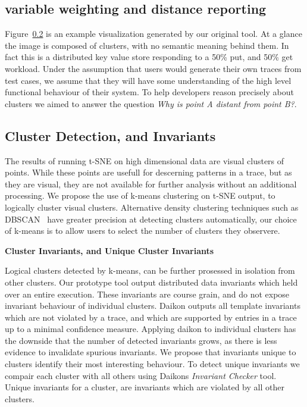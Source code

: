 \subsection{variable weighting and distance reporting}

Figure~\ref{} is an example
visualization generated by our original tool. At a glance the image is
composed of  clusters, with no semantic meaning behind them.
In fact this is a distributed key value store responding to a 50\%
put, and 50\% get workload. Under the assumption that users would
generate their own traces from test cases, we assume that they will
have some understanding of the high level functional behaviour of
their system. To help developers reason precisely about clusters we
aimed to answer the question \emph{Why is point A distant from point
B?}. 

\subsection{Cluster Detection, and Invariants}

The results of running t-SNE on high dimensional data are visual
clusters of points. While these points are usefull for descerning
patterns in a trace, but as they are visual, they are not available
for further analysis without an additional processing. We propose the
use of k-means clustering on t-SNE output, to logically cluster visual
clusters. Alternative density clustering techniques such as
DBSCAN~\cite{} have greater precision at detecting
clusters automatically, our choice of k-means is to allow users to
select the number of clusters they observere.

\textbf{Cluster Invariants, and Unique Cluster Invariants}

Logical clusters detected by k-means, can be further prosessed in
isolation from other clusters. Our prototype tool output distributed
data invariants which held over an entire execution. These invariants
are course grain, and do not expose invariant behaviour of individual
clusters.  
%
Daikon outputs all template invariants which are not violated by a
trace, and which are supported by entries in a trace up to a minimal
confidence measure. Applying daikon to individual clusters has the
downside that the number of detected invariants grows, as there is
less evidence to invalidate spurious invariants. We propose that
invariants unique to clusters identify their most interesting
behaviour. To detect unique invariants we compair each cluster with
all others using Daikons \emph{Invariant Checker} tool. Unique
invariants for a cluster, are invariants which are violated by all
other clusters.



